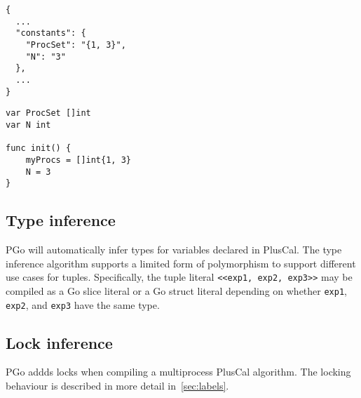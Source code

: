 \noindent\begin{minipage}{0.45\textwidth}
\begin{lstlisting}
{
  ...
  "constants": {
    "ProcSet": "{1, 3}",
    "N": "3"
  },
  ...
}
\end{lstlisting}
\end{minipage}
\hfill\begin{minipage}{0.45\textwidth}
\begin{lstlisting}[language=golang]
var ProcSet []int
var N int

func init() {
	myProcs = []int{1, 3}
	N = 3
}
\end{lstlisting}
\end{minipage}

\subsection{Type inference}
PGo will automatically infer types for variables declared in PlusCal. The type inference algorithm supports a limited form of polymorphism to support different use cases for tuples. Specifically, the tuple literal \lstinline[language=pcal]|<<exp1, exp2, exp3>>| may be compiled as a Go slice literal or a Go struct literal depending on whether \lstinline[language=pcal]|exp1|, \lstinline[language=pcal]|exp2|, and \lstinline[language=pcal]|exp3| have the same type.

\subsection{Lock inference}
PGo addds locks when compiling a multiprocess PlusCal algorithm. The locking behaviour is described in more detail in~\ref{sec:labels}.
